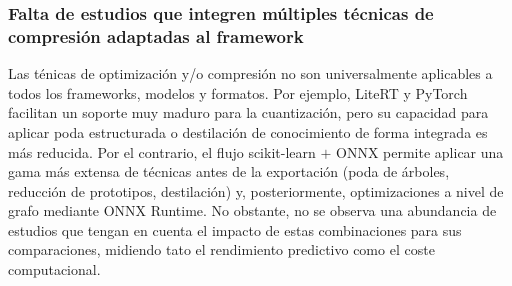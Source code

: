\documentclass[a4paper,12pt,twoside,final]{book}
\begin{document}
\subsubsection*{Falta de estudios que integren múltiples técnicas de compresión adaptadas al framework}
Las ténicas de optimización y/o compresión no son universalmente aplicables a todos los frameworks, modelos y
formatos. Por ejemplo, LiteRT y PyTorch facilitan un soporte muy maduro para la cuantización, pero su capacidad para
aplicar poda estructurada o destilación de conocimiento de forma integrada es más reducida. Por el contrario, el
flujo scikit-learn $+$ ONNX permite aplicar una gama más extensa de técnicas antes de la exportación (poda de árboles,
reducción de prototipos, destilación) y, posteriormente, optimizaciones a nivel de grafo mediante ONNX Runtime. No
obstante, no se observa una abundancia de estudios que tengan en cuenta el impacto de estas combinaciones para sus
comparaciones, midiendo tato el rendimiento predictivo como el coste computacional.


\end{document}
